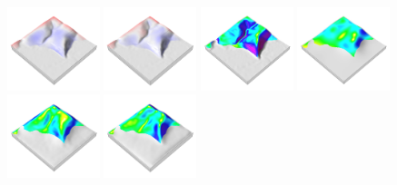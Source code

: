 \documentclass[prodmode,acmtochi]{acmsmall} %
\begin{document}
\begin{figure}[h!]
\begin{center}
		\includegraphics[width=0.24\textwidth]{images/render_3d/mean_dem_regression_difference_2.png}
		\includegraphics[width=0.24\textwidth]{images/render_3d/mean_dem_regression_difference_3.png}
		\includegraphics[width=0.24\textwidth]{images/render_3d/slope_1.png}
		\includegraphics[width=0.24\textwidth]{images/render_3d/mean_slope_1.png}
		\includegraphics[width=0.24\textwidth]{images/render_3d/mean_slope_2.png}
		\includegraphics[width=0.24\textwidth]{images/render_3d/mean_slope_3.png}

\end{center}
\end{figure}
\end{document}
